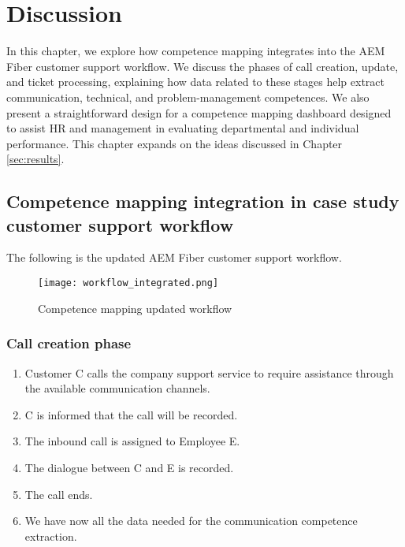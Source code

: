 \chapter{Discussion}
\label{sec:discussion}

In this chapter, we explore how competence mapping integrates into the AEM Fiber customer support workflow. We discuss the phases of call creation, update, and ticket processing, explaining how data related to %
these stages help extract communication, technical, and problem-management competences. We also present a straightforward design for a competence mapping dashboard designed to assist HR and management in evaluating departmental and individual performance. This chapter expands on the ideas discussed in Chapter \ref{sec:results}.

\section{Competence mapping integration in case study customer support workflow}

The following is the updated AEM Fiber customer support workflow.

\begin{figure}[ht]
      \centering
      \texttt{[image: workflow\_integrated.png]}
      \caption{Competence mapping updated workflow}
      \label{figure:workflow_integrated}
\end{figure}

\subsection{Call creation phase}

\begin{enumerate}
      \item Customer C calls the company support service to require assistance through the available communication channels.
      \item C is informed that the call will be recorded.
      \item The inbound call is assigned to Employee E.
      \item The dialogue between C and E is recorded.
      \item The call ends.
      \item We have now all the data needed for the communication competence extraction.
\end{enumerate}

